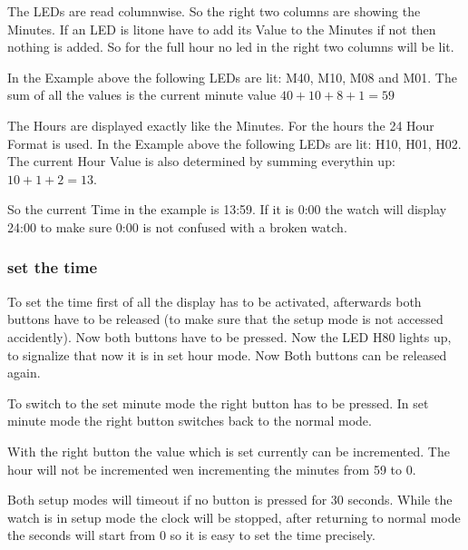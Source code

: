 The LEDs are read columnwise. So the right two columns are showing the Minutes. If an LED is litone have to add its Value to the Minutes if not then nothing is added. So for the full hour no led in the right two columns will be lit.

In the Example above the following LEDs are lit: M40, M10, M08 and M01.
The sum of all the values is the current minute value $40+10+8+1=59$

The Hours are displayed exactly like the Minutes. For the hours the 24 Hour Format is used. In the Example above the following LEDs are lit: H10, H01, H02. The current Hour Value is also determined by summing everythin up: $10+1+2=13$.

So the current Time in the example is 13:59. If it is 0:00 the watch will display 24:00 to make sure 0:00 is not confused with a broken watch.
\subsubsection{set the time}
To set the time first of all the display has to be activated, afterwards both buttons have to be released (to make sure that the setup mode is not accessed accidently). Now both buttons have to be pressed. Now the LED H80 lights up, to signalize that now it is in set hour mode. Now Both buttons can be released again.

To switch to the set minute mode the right button has to be pressed. In set minute mode the right button switches back to the normal mode.

With the right button the value which is set currently can be incremented.
The hour will not be incremented wen incrementing the minutes from 59 to 0.

Both setup modes will timeout if no button is pressed for 30 seconds.
While the watch is in setup mode the clock will be stopped, after returning to normal mode the seconds will start from 0 so it is easy to set the time precisely.

